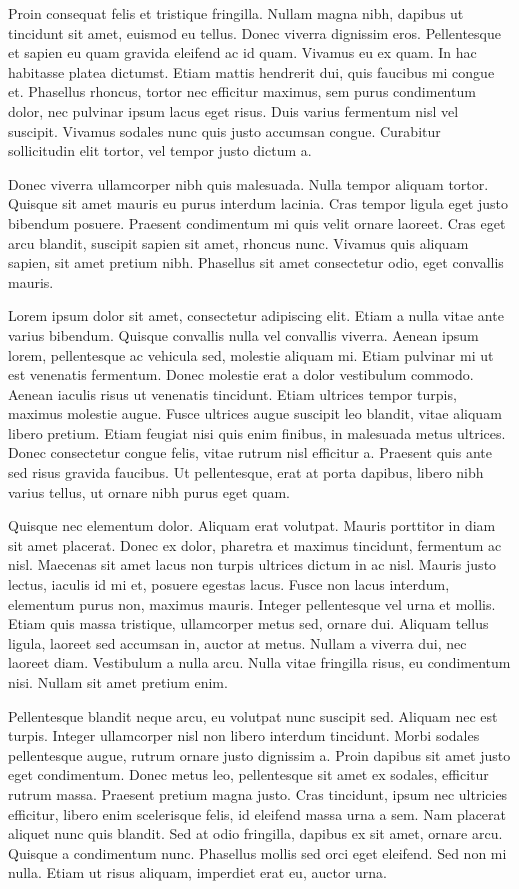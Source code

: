 \documentclass{novanarrative}
\begin{document}
Proin consequat felis et tristique fringilla. Nullam magna nibh, dapibus ut tincidunt sit amet, euismod eu tellus. Donec viverra dignissim eros. Pellentesque et sapien eu quam gravida eleifend ac id quam. Vivamus eu ex quam. In hac habitasse platea dictumst. Etiam mattis hendrerit dui, quis faucibus mi congue et. Phasellus rhoncus, tortor nec efficitur maximus, sem purus condimentum dolor, nec pulvinar ipsum lacus eget risus. Duis varius fermentum nisl vel suscipit. Vivamus sodales nunc quis justo accumsan congue. Curabitur sollicitudin elit tortor, vel tempor justo dictum a.

Donec viverra ullamcorper nibh quis malesuada. Nulla tempor aliquam tortor. Quisque sit amet mauris eu purus interdum lacinia. Cras tempor ligula eget justo bibendum posuere. Praesent condimentum mi quis velit ornare laoreet. Cras eget arcu blandit, suscipit sapien sit amet, rhoncus nunc. Vivamus quis aliquam sapien, sit amet pretium nibh. Phasellus sit amet consectetur odio, eget convallis mauris.

Lorem ipsum dolor sit amet, consectetur adipiscing elit. Etiam a nulla vitae ante varius bibendum. Quisque convallis nulla vel convallis viverra. Aenean ipsum lorem, pellentesque ac vehicula sed, molestie aliquam mi. Etiam pulvinar mi ut est venenatis fermentum. Donec molestie erat a dolor vestibulum commodo. Aenean iaculis risus ut venenatis tincidunt. Etiam ultrices tempor turpis, maximus molestie augue. Fusce ultrices augue suscipit leo blandit, vitae aliquam libero pretium. Etiam feugiat nisi quis enim finibus, in malesuada metus ultrices. Donec consectetur congue felis, vitae rutrum nisl efficitur a. Praesent quis ante sed risus gravida faucibus. Ut pellentesque, erat at porta dapibus, libero nibh varius tellus, ut ornare nibh purus eget quam.

Quisque nec elementum dolor. Aliquam erat volutpat. Mauris porttitor in diam sit amet placerat. Donec ex dolor, pharetra et maximus tincidunt, fermentum ac nisl. Maecenas sit amet lacus non turpis ultrices dictum in ac nisl. Mauris justo lectus, iaculis id mi et, posuere egestas lacus. Fusce non lacus interdum, elementum purus non, maximus mauris. Integer pellentesque vel urna et mollis. Etiam quis massa tristique, ullamcorper metus sed, ornare dui. Aliquam tellus ligula, laoreet sed accumsan in, auctor at metus. Nullam a viverra dui, nec laoreet diam. Vestibulum a nulla arcu. Nulla vitae fringilla risus, eu condimentum nisi. Nullam sit amet pretium enim.

Pellentesque blandit neque arcu, eu volutpat nunc suscipit sed. Aliquam nec est turpis. Integer ullamcorper nisl non libero interdum tincidunt. Morbi sodales pellentesque augue, rutrum ornare justo dignissim a. Proin dapibus sit amet justo eget condimentum. Donec metus leo, pellentesque sit amet ex sodales, efficitur rutrum massa. Praesent pretium magna justo. Cras tincidunt, ipsum nec ultricies efficitur, libero enim scelerisque felis, id eleifend massa urna a sem. Nam placerat aliquet nunc quis blandit. Sed at odio fringilla, dapibus ex sit amet, ornare arcu. Quisque a condimentum nunc. Phasellus mollis sed orci eget eleifend. Sed non mi nulla. Etiam ut risus aliquam, imperdiet erat eu, auctor urna.
\end{document}
